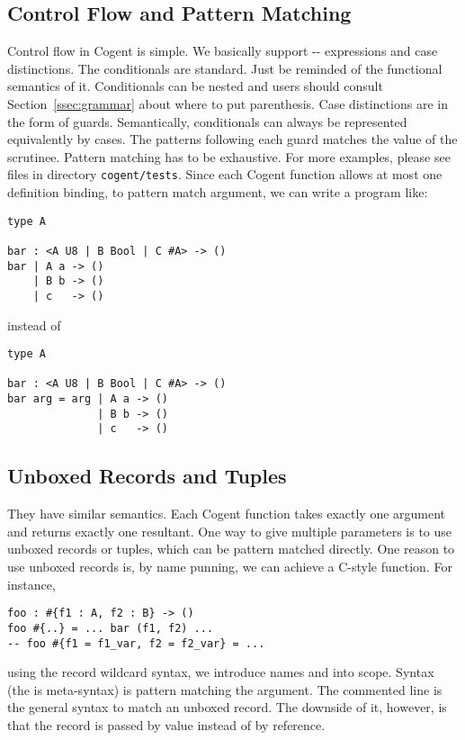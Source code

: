 \documentclass[a4paper]{article}
\newcommand{\cogent}{Cogent\xspace}
\begin{document}
\subsection{Control Flow and Pattern Matching}
Control flow in \cogent is simple. We basically support --
expressions and case distinctions. The conditionals are standard. Just be reminded of the
functional semantics of it. Conditionals can be nested and users should consult Section~\ref{ssec:grammar} about where to put parenthesis. Case distinctions are in the form
of guards. Semantically, conditionals can always be represented equivalently by cases.
The patterns following each guard matches the value of the scrutinee. Pattern matching has
to be exhaustive. For more examples, please see files in directory \texttt{cogent/tests}.
Since each \cogent function allows at most one definition binding, to pattern match argument, we can write
a program like:
\begin{lstlisting}[language=Cogent]
type A

bar : <A U8 | B Bool | C #A> -> ()
bar | A a -> ()
    | B b -> ()
    | c   -> ()
\end{lstlisting}
instead of
\begin{lstlisting}[language=Cogent]
type A

bar : <A U8 | B Bool | C #A> -> ()
bar arg = arg | A a -> ()
              | B b -> ()
              | c   -> ()
\end{lstlisting}


\subsection{Unboxed Records and Tuples} They have similar semantics.
Each \cogent function takes exactly one argument and returns exactly one resultant.
One way to give multiple parameters is to use unboxed records or tuples, which can be
pattern matched directly. One reason to use unboxed records is, by name punning,
we can achieve a C-style function. For instance,
\begin{lstlisting}[language=Cogent]
foo : #{f1 : A, f2 : B} -> ()
foo #{..} = ... bar (f1, f2) ...
-- foo #{f1 = f1_var, f2 = f2_var} = ...
\end{lstlisting}
using the record wildcard syntax, we introduce names  and 
into scope. Syntax  (the  is meta-syntax) is 
pattern matching the argument. The commented line is the general syntax to match
an unboxed record. The downside of it, however, is that the record is passed by value
instead of by reference.
\end{document}
